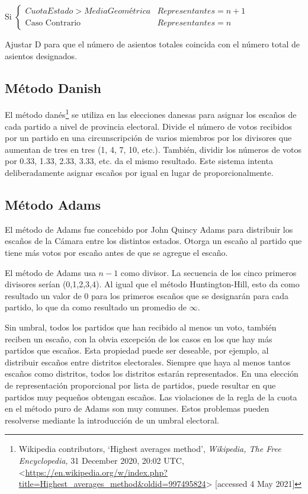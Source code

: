 \documentclass[12pt,a4paper,]{book}
\let\rmarkdownfootnote\footnote%
\def\footnote{\protect\rmarkdownfootnote}
\numberwithin{dummy}{section}
\theoremstyle{ocrenumbox}
\theoremstyle{blacknumex}
\theoremstyle{blacknumbox}
\theoremstyle{ocrenum}
\theoremstyle{ocrenum}
\begin{document}
Si
\(\begin{cases}CuotaEstado>MediaGeométrica & Representantes = n+1\\\textrm{Caso Contrario} & Representantes = n\end{cases}\)

Ajustar D para que el número de asientos totales coincida con el número
total de asientos designados.

\hypertarget{muxe9todo-danish}{%
\subsection{Método Danish}\label{muxe9todo-danish}}

El método danés\footnote{Wikipedia contributors, `Highest averages
  method', \emph{Wikipedia, The Free Encyclopedia,} 31 December 2020,
  20:02 UTC,
  \textless{}\url{https://en.wikipedia.org/w/index.php?title=Highest_averages_method\&oldid=997495824}\textgreater{}
  {[}accessed 4 May 2021{]}} se utiliza en las elecciones danesas para
asignar los escaños de cada partido a nivel de provincia electoral.
Divide el número de votos recibidos por un partido en una
circunscripción de varios miembros por los divisores que aumentan de
tres en tres (1, 4, 7, 10, etc.). También, dividir los números de votos
por 0.33, 1.33, 2.33, 3.33, etc. da el mismo resultado. Este sistema
intenta deliberadamente asignar escaños por igual en lugar de
proporcionalmente.

\hypertarget{muxe9todo-adams}{%
\subsection{Método Adams}\label{muxe9todo-adams}}

El método de Adams fue concebido por John Quincy Adams para distribuir
los escaños de la Cámara entre los distintos estados. Otorga un escaño
al partido que tiene más votos por escaño antes de que se agregue el
escaño.

El método de Adams usa \(n-1\) como divisor. La secuencia de los cinco
primeros divisores serían (0,1,2,3,4). Al igual que el método
Huntington-Hill, esto da como resultado un valor de 0 para los primeros
escaños que se designarán para cada partido, lo que da como resultado un
promedio de \(\infty\).

Sin umbral, todos los partidos que han recibido al menos un voto,
también reciben un escaño, con la obvia excepción de los casos en los
que hay más partidos que escaños. Esta propiedad puede ser deseable, por
ejemplo, al distribuir escaños entre distritos electorales. Siempre que
haya al menos tantos escaños como distritos, todos los distritos estarán
representados. En una elección de representación proporcional por lista
de partidos, puede resultar en que partidos muy pequeños obtengan
escaños. Las violaciones de la regla de la cuota en el método puro de
Adams son muy comunes. Estos problemas pueden resolverse mediante la
introducción de un umbral electoral.
\end{document}
